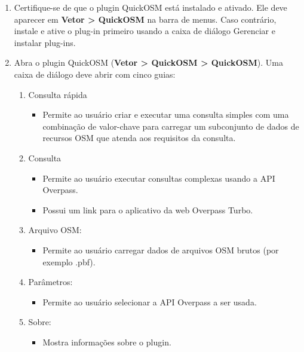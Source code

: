 \documentclass[
  portuguese,
]{krantz}
\providecommand{\tightlist}{%
  \setlength{\itemsep}{0pt}\setlength{\parskip}{0pt}}
\begin{document}
\begin{enumerate}
\def\labelenumi{\arabic{enumi}.}
\setcounter{enumi}{1}
\item
  Certifique-se de que o plugin QuickOSM está instalado e ativado. Ele deve aparecer em \textbf{Vetor \textgreater{} QuickOSM} na barra de menus. Caso contrário, instale e ative o plug-in primeiro usando a caixa de diálogo Gerenciar e instalar plug-ins.
\item
  Abra o plugin QuickOSM (\textbf{Vetor \textgreater{} QuickOSM \textgreater{} QuickOSM}). Uma caixa de diálogo deve abrir com cinco guias:

  \begin{enumerate}
  \def\labelenumii{\arabic{enumii}.}
  \tightlist
  \item
    Consulta rápida

    \begin{itemize}
    \tightlist
    \item
      Permite ao usuário criar e executar uma consulta simples com uma combinação de valor-chave para carregar um subconjunto de dados de recursos OSM que atenda aos requisitos da consulta.
    \end{itemize}
  \item
    Consulta

    \begin{itemize}
    \tightlist
    \item
      Permite ao usuário executar consultas complexas usando a API Overpass.
    \item
      Possui um link para o aplicativo da web Overpass Turbo.
    \end{itemize}
  \item
    Arquivo OSM:

    \begin{itemize}
    \tightlist
    \item
      Permite ao usuário carregar dados de arquivos OSM brutos (por exemplo .pbf).
    \end{itemize}
  \item
    Parâmetros:

    \begin{itemize}
    \tightlist
    \item
      Permite ao usuário selecionar a API Overpass a ser usada.
    \end{itemize}
  \item
    Sobre:

    \begin{itemize}
    \tightlist
    \item
      Mostra informações sobre o plugin.
    \end{itemize}
  \end{enumerate}
\end{enumerate}
\end{document}
